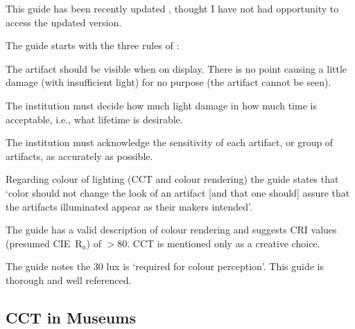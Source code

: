 This guide \citep{ies_ies_1996} has been recently updated \citep{ies_ansi/ies_2017}, thought I have not had opportunity to access the updated version.

The guide starts with the three rules of \citet{michalski_damage_1987}:

\begin{itquote}{}
The artifact should be visible when on display. There is no point causing a little damage (with insufficient light) for no purpose (the artifact cannot be seen).

The institution must decide how much light damage in how much time is acceptable, i.e., what lifetime is desirable.

The institution must acknowledge the sensitivity of each artifact, or group of artifacts, as accurately as possible.
\end{itquote}

Regarding colour of lighting (\gls{CCT} and colour rendering) the guide states that `color should not change the look of an artifact [and that one should] assure that the artifacts illuminated appear as their makers intended'.

The guide has a valid description of colour rendering and suggests CRI values (presumed \gls{CIE}~R$_a$) of $>80$. \gls{CCT} is mentioned only as a creative choice.

The guide notes the 30 lux is `required for colour perception'. This guide is thorough and well referenced.





















\subsection{CCT in Museums}
\label{sec:CCTmus}

